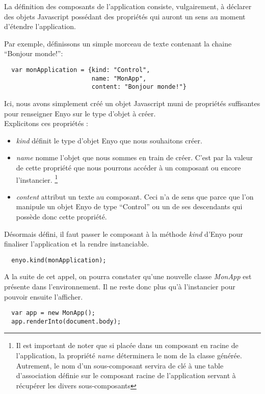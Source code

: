 \documentclass[11pt,a4paper]{report}
\begin{document}
La définition des composants de l'application consiste, vulgairement, à déclarer 
des objets Javascript possédant des propriétés qui auront un sens au moment d'étendre
l'application.\smallskip

Par exemple, définissons un simple morceau de texte contenant la chaine ``Bonjour monde!'':
\begin{lstlisting}
  var monApplication = {kind: "Control",
                        name: "MonApp",
                        content: "Bonjour monde!"}
\end{lstlisting}

Ici, nous avons simplement créé un objet Javascript muni de propriétés suffisantes 
pour renseigner Enyo sur le type d'objet à créer.\\
Explicitons ces propriétés :
\begin{itemize}
\item \emph{kind} définit le type d'objet Enyo que nous souhaitons créer.\smallskip
\item \emph{name} nomme l'objet que nous sommes en train de créer. C'est par la
valeur de cette propriété que nous pourrons accéder à un composant ou encore l'instancier.
\footnote{Il est important de noter que si placée dans un composant en racine de l'application,
la propriété \emph{name} déterminera le nom de la classe générée. Autrement, le nom d'un sous-composant
servira de clé à une table d'association définie sur le composant racine de l'application 
servant à récupérer les divers sous-composants
}\smallskip
\item \emph{content} attribut un texte au composant. Ceci n'a de sens que parce que l'on manipule
un objet Enyo de type ``Control'' ou un de ses descendants qui possède donc cette propriété.\smallskip
\end{itemize}\medskip

Désormais défini, il faut passer le composant à la méthode \emph{kind} d'Enyo pour finaliser l'application
et la rendre instanciable.

\begin{lstlisting}
  enyo.kind(monApplication);
\end{lstlisting}

A la suite de cet appel, on pourra constater qu'une nouvelle classe \mbox{\emph{MonApp}} est présente 
dans l'environnement. Il ne reste donc plus qu'à l'instancier pour pouvoir ensuite l'afficher.

\clearpage

\begin{lstlisting}
  var app = new MonApp();
  app.renderInto(document.body);
\end{lstlisting}
\end{document}
